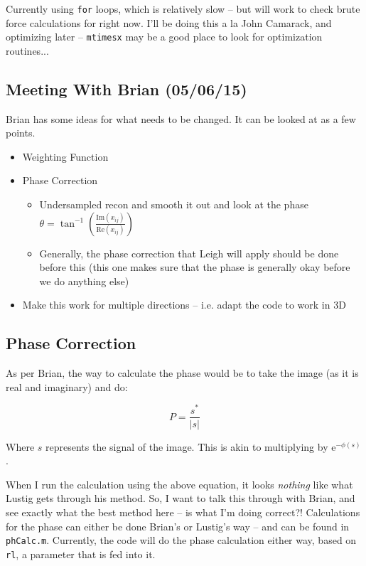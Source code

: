 \documentclass[11 pt]{article}
\newcommand{\me}{\mathrm{e}}
\begin{document}
  Currently using \texttt{for} loops, which is relatively slow -- but will work to check brute force calculations for right now. I'll be doing this a la John Camarack, and optimizing later -- \texttt{mtimesx} may be a good place to look for optimization routines...
  
  \subsection{Meeting With Brian (05/06/15)}
    Brian has some ideas for what needs to be changed. It can be looked at as a few points.
    \begin{itemize}
      \item Weighting Function
      \item Phase Correction
        \begin{itemize}
          \item Undersampled recon and smooth it out and look at the phase 
          $
          \theta = \tan^{-1}
          \left(
          \frac{\text{Im}(x_{ij})}
               {\text{Re}(x_{ij})}
               \right)
          $
          \item Generally, the phase correction that Leigh will apply should be done before this (this one makes sure that the phase is generally okay before we do anything else)
          \end{itemize}

      \item Make this work for multiple directions -- i.e. adapt the code to work in 3D
      \end{itemize}


  \subsection{Phase Correction}
    As per Brian, the way to calculate the phase would be to take the image (as it is real and imaginary) and do:

    \[ P = \frac{s^*}{|s|} \]

    Where $s$ represents the signal of the image. This is akin to multiplying by $\me^{-\phi(s)}$.

    When I run the calculation using the above equation, it looks \emph{nothing} like what Lustig gets through his method. So, I want to talk this through with Brian, and see exactly what the best method here -- is what I'm doing correct?! Calculations for the phase can either be done Brian's or Lustig's way -- and can be found in \texttt{phCalc.m}. Currently, the code will do the phase calculation either way, based on \texttt{rl}, a parameter that is fed into it. 
\end{document}
